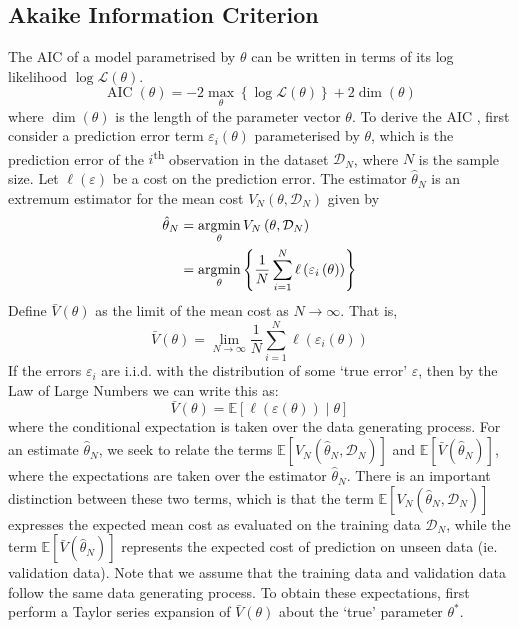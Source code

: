 \documentclass[11pt]{report} %
\begin{document}
\subsection{Akaike Information Criterion}

The AIC of a model parametrised by $\theta$ can be written in terms of its log likelihood $\log\mathcal{L}\left(\theta\right)$.
\begin{equation}
\operatorname{AIC}\left(\theta\right) = -2\max_{\theta}\left\{\log\mathcal{L}\left(\theta\right)\right\} + 2\dim\left(\theta\right)
\end{equation}
where $\dim\left(\theta\right)$ is the length of the parameter vector $\theta$. To derive the AIC \cite{Ljung1999}, first consider a prediction error term $\varepsilon_{i}\left(\theta\right)$ parameterised by $\theta$, which is the prediction error of the $i$\textsuperscript{th} observation in the dataset $\mathcal{D}_{N}$, where $N$ is the sample size. Let $\ell\left(\varepsilon\right)$ be a cost on the prediction error. The estimator $\hat{\theta}_{N}$ is an extremum estimator for the mean cost $V_{N}\left(\theta, \mathcal{D}_{N}\right)$ given by
\begin{align}
\hat{\theta}_{N} &= \operatorname*{argmin}_{\theta}V_{N}\left(\theta, \mathcal{D}_{N}\right) \\
&= \operatorname*{argmin}_{\theta}\left\{\dfrac{1}{N}\sum_{i = 1}^{N}\ell\left(\varepsilon_{i}\left(\theta\right)\right)\right\}
\end{align}
Define $\bar{V}\left(\theta\right)$ as the limit of the mean cost as $N\to\infty$. That is,
\begin{equation}
\bar{V}\left(\theta\right) = \lim_{N\to\infty}\dfrac{1}{N}\sum_{i = 1}^{N}\ell\left(\varepsilon_{i}\left(\theta\right)\right)
\end{equation}
If the errors $\varepsilon_{i}$ are i.i.d. with the distribution of some `true error' $\varepsilon$, then by the Law of Large Numbers we can write this as:
\begin{equation}
\bar{V}\left(\theta\right) = \mathbb{E}\left[\ell\left(\varepsilon\left(\theta\right)\right)\middle|\theta\right]
\end{equation}
where the conditional expectation is taken over the data generating process. For an estimate $\hat{\theta}_{N}$, we seek to relate the terms $\mathbb{E}\left[V_{N}\left(\hat{\theta}_{N}, \mathcal{D}_{N}\right)\right]$ and $\mathbb{E}\left[\bar{V}\left(\hat{\theta}_{N}\right)\right]$, where the expectations are taken over the estimator $\hat{\theta}_{N}$. There is an important distinction between these two terms, which is that the term $\mathbb{E}\left[V_{N}\left(\hat{\theta}_{N}, \mathcal{D}_{N}\right)\right]$ expresses the expected mean cost as evaluated on the training data $\mathcal{D}_{N}$, while the term $\mathbb{E}\left[\bar{V}\left(\hat{\theta}_{N}\right)\right]$ represents the expected cost of prediction on unseen data (ie. validation data). Note that we assume that the training data and validation data follow the same data generating process. To obtain these expectations, first perform a Taylor series expansion of $\bar{V}\left(\theta\right)$ about the `true' parameter $\theta^{*}$.
\end{document}

